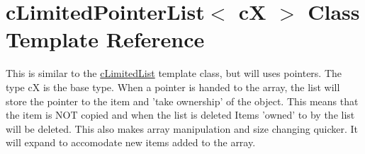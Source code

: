 \hypertarget{classc_limited_pointer_list}{
\section{cLimitedPointerList$<$ cX $>$ Class Template Reference}
\label{classc_limited_pointer_list}
}


This is similar to the \hyperlink{classc_limited_list}{cLimitedList} template class, but will uses pointers. The type cX is the base type. When a pointer is handed to the array, the list will store the pointer to the item and 'take ownership' of the object. This means that the item is NOT copied and when the list is deleted Items 'owned' to by the list will be deleted. This also makes array manipulation and size changing quicker. It will expand to accomodate new items added to the array.  


